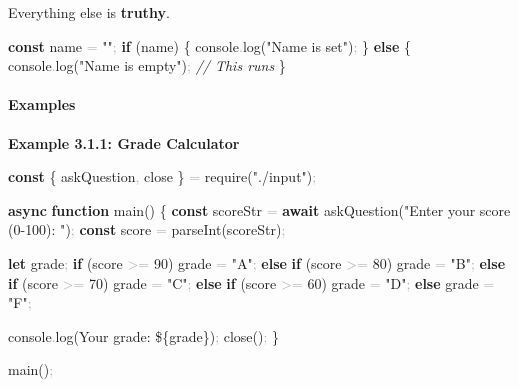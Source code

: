 \documentclass[
  justified,
  openright,
]{tufte-book}
\let\subsection\paragraph
\let\paragraph\paragraph
\newcommand{\KeywordTok}[1]{\textcolor{CodeKeyword}{\textbf{#1}}}  %
\newcommand{\StringTok}[1]{\textcolor{CodeString}{#1}}              %
\newcommand{\CommentTok}[1]{\textcolor{CodeComment}{\textit{#1}}}  %
\newcommand{\CodeNumTok}[1]{\textcolor{CodeNumber}{#1}}             %
\newcommand{\CodeFuncTok}[1]{\textcolor{CodeKeyword}{#1}}           %
\newcommand{\CodeAccentTok}[1]{\textcolor{CodeAccent}{#1}}          %
\newcommand{\OperatorTok}[1]{\textcolor{DarkGray}{#1}}              %
\newenvironment{Shaded}{%
  \begin{mdframed}[style=TufteCode]%
}{%
  \end{mdframed}%
}
\let\subsection\paragraph
\let\paragraph\paragraph
\begin{document}
Everything else is \textbf{truthy}.

\begin{Shaded}
\begin{Highlighting}[]
\KeywordTok{const} name \OperatorTok{=} \StringTok{""}\OperatorTok{;}
\KeywordTok{if} (name) \{
  console\OperatorTok{.}\CodeFuncTok{log}(\StringTok{"Name is set"})\OperatorTok{;}
\} \KeywordTok{else} \{
  console\OperatorTok{.}\CodeFuncTok{log}(\StringTok{"Name is empty"})\OperatorTok{;} \CommentTok{// This runs}
\}
\end{Highlighting}
\end{Shaded}

\subsection{Examples}\label{examples-16}

\textbf{Example 3.1.1: Grade Calculator}

\begin{Shaded}
\begin{Highlighting}[]
\KeywordTok{const} \{ askQuestion\OperatorTok{,} close \} \OperatorTok{=} \CodeAccentTok{require}(\StringTok{"./input"})\OperatorTok{;}
 
\KeywordTok{async} \KeywordTok{function} \CodeFuncTok{main}() \{
  \KeywordTok{const} scoreStr \OperatorTok{=} \KeywordTok{await} \CodeFuncTok{askQuestion}(\StringTok{"Enter your score (0{-}100): "})\OperatorTok{;}
  \KeywordTok{const} score \OperatorTok{=} \CodeAccentTok{parseInt}(scoreStr)\OperatorTok{;}
 
  \KeywordTok{let} grade\OperatorTok{;}
  \KeywordTok{if} (score \OperatorTok{\textgreater{}=} \CodeNumTok{90}) grade \OperatorTok{=} \StringTok{"A"}\OperatorTok{;}
  \KeywordTok{else} \KeywordTok{if} (score \OperatorTok{\textgreater{}=} \CodeNumTok{80}) grade \OperatorTok{=} \StringTok{"B"}\OperatorTok{;}
  \KeywordTok{else} \KeywordTok{if} (score \OperatorTok{\textgreater{}=} \CodeNumTok{70}) grade \OperatorTok{=} \StringTok{"C"}\OperatorTok{;}
  \KeywordTok{else} \KeywordTok{if} (score \OperatorTok{\textgreater{}=} \CodeNumTok{60}) grade \OperatorTok{=} \StringTok{"D"}\OperatorTok{;}
  \KeywordTok{else} grade \OperatorTok{=} \StringTok{"F"}\OperatorTok{;}
 
  console\OperatorTok{.}\CodeFuncTok{log}(\StringTok{\textasciigrave{}Your grade: }\StringTok{\$\{}grade\StringTok{\}}\StringTok{\textasciigrave{}})\OperatorTok{;}
  \CodeFuncTok{close}()\OperatorTok{;}
\}
 
\CodeFuncTok{main}()\OperatorTok{;}
\end{Highlighting}
\end{Shaded}
\end{document}
